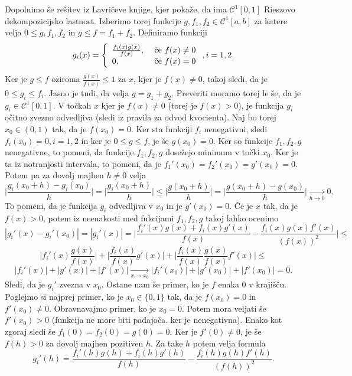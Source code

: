 \documentclass[a4paper, 12pt]{article}
\begin{document}
Dopolnimo še rešitev iz Lavričeve knjige, kjer pokaže, da ima $\mathcal{C}^1 [0,1]$ Rieszovo dekompozicijsko lastnost. Izberimo torej funkcije $g,f_1,f_2 \in \mathcal{C}^1[a,b]$ za katere velja $0\le g,f_1, f_2$ in $g\le f = f_1 + f_2$. Definiramo funkciji 
$$
g_i(x) = 
\left\{
\begin{array}{l l}
\frac{f_i(x) g(x)}{f(x)}, & \text{ če } f(x) \neq 0 \\
0, & \text{ če } f(x) = 0
\end{array}
\right.
, i = 1,2.
$$
Ker je $g\le f$ oziroma $\frac{g(x)}{f(x)} \le 1$ za $x$, kjer je $f(x) \neq 0$, takoj sledi, da je $0\le g_i  \le f_i$. Jasno je tudi, da velja $g= g_1 + g_2$. Preveriti moramo torej le še, da je $g_i \in \mathcal{C}^1[0,1]$. V točkah $x$ kjer je $f(x) \neq 0$ (torej je $f(x) > 0$), je funkcija $g_i$ očitno zvezno odvedljiva (sledi iz pravila za odvod kvocienta). Naj bo torej $x_0 \in (0,1)$ tak, da je $f(x_0) = 0$. Ker sta funkciji $f_i$ nenegativni, sledi $f_i(x_0) = 0, i=1,2$ in ker je $0\le g\le f$, je še $g(x_0) = 0$. Ker so funkcije $f_1,f_2,g$ nenegativne, to pomeni, da funkcije $f_1,f_2,g$ dosežejo minimum v točki $x_0$. Ker je ta iz notranjosti intervala, to pomeni, da je $f_1'(x_0) = f_2'(x_0)= g'(x_0)=0$. Potem pa za dovolj majhen $h\neq 0$ velja
$$
\big| \frac{g_i(x_0 + h) - g_i(x_0)}{h}\big| =\big|\frac{g_i(x_0+h)}{h}\big| \le \big|\frac{g(x_0+h)}{h}\big| = \big|\frac{g(x_0+h) - g(x_0)}{h}\big| \xrightarrow[h\rightarrow 0]{} 0.
$$
To pomeni, da je funkcija $g_i$ odvedljiva v $x_0$ in je $g'(x_0) = 0$. Če je $x$ tak, da je $f(x)>0$, potem iz neenakosti med fukcijami $f_1,f_2,g$ takoj lahko ocenimo
$$
|g_i'(x) - g_i'(x_0) | = |g_i'(x)| = \big|\frac{f_i'(x) g(x) + f_i(x) g'(x)}{f(x)} - \frac{f_i(x) g(x) f'(x)}{(f(x))^2}  \big| \le 
$$
$$
\big| f_i'(x)  \frac{g(x)}{f(x)} \big| + \big| \frac{f_i(x)}{f(x)} g'(x)\big| + \big| \frac{f_i(x)}{f(x)}\frac{g(x)}{f(x)} f'(x) \big| \le
$$
$$
|f_i'(x)| + |g'(x)| + |f'(x)| \xrightarrow[x\rightarrow x_0]{} |f_i'(x_0)| + |g'(x_0)| + |f'(x_0)| = 0.
$$
Sledi, da je $g_i'$ zvezna v $x_0$. Ostane nam še primer, ko je $f$ enaka 0 v krajišču. Poglejmo si najprej primer, ko je $x_0\in \{0,1\}$ tak, da je $f(x_0) = 0 $ in $f'(x_0) \neq 0$. Obravnavajmo primer, ko je $x_0 = 0$. Potem mora veljati še $f'(x_0) > 0$ (funkcija ne more biti padajoča. ker je nenegativna). Enako kot zgoraj sledi še $f_1(0) = f_2(0) = g(0) = 0$. Ker je $f'(0) \neq 0$, je še $f(h) > 0$ za dovolj majhen pozitiven $h$. Za take $h$ potem velja formula
$$
g_i'(h) = \frac{f_i'(h) g(h) + f_i(h) g'(h)}{f(h)} - \frac{f_i(h)g(h)f'(h)}{(f(h))^2}. 
$$
\end{document}
